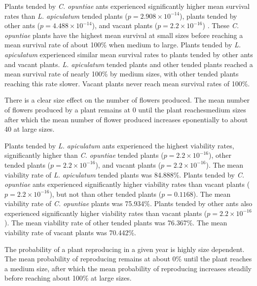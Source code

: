 \documentclass[11pt]{article}
\begin{document}
Plants tended by \textit{C. opuntiae} ants experienced significantly higher mean survival rates than \textit{L. apiculatum} tended plants ($p = 2.908 \times 10^{-14}$), plants tended by other ants ($p = 4.488 \times 10^{-14}$), and vacant plants ($p = 2.2 \times 10^{-16}$) \cite{fig:surv}. 
These \textit{C. opuntiae} plants have the highest mean survival at small sizes before reaching a mean survival rate of about 100\% when medium to large.
Plants tended by \textit{L. apiculatum} experienced similar mean survival rates to plants tended by other ants and vacant plants.
\textit{L. apiculatum} tended plants and other tended plants reached a mean survival rate of nearly 100\% by medium sizes, with other tended plants reaching this rate slower. 
Vacant plants never reach mean survival rates of 100\%. 

There is a clear size effect on the number of flowers produced. 
The mean number of flowers produced by a plant remains at 0 until the plant reachesmedium sizes after which the mean number of flower produced increases eponentially to about 40 at large sizes.


Plants tended by \textit{L. apiculatum} ants experienced the highest viability rates, significantly higher than \textit{C. opuntiae} tended plants ($p = 2.2 \times 10^{-16}$), other tended plants ($p = 2.2 \times 10^{-16}$), and vacant plants ($p = 2.2 \times 10^{-16}$).
The mean viability rate of \textit{L. apiculatum} tended plants was 84.888\%.
Plants tended by \textit{C. opuntiae} ants experienced significantly higher viability rates than vacant plants ($p = 2.2 \times 10^{-16}$), but not than other tended plants ($p = 0.1168$).
The mean viability rate of \textit{C. opuntiae} plants was 75.934\%.
Plants tended by other ants also experienced significantly higher viability rates than vacant plants ($p = 2.2 \times 10^{-16}$).
The mean viability rate of other tended plants was 76.367\%.
The mean viability rate of vacant plants was 70.442\%.

The probability of a plant reproducing in a given year is highly size dependent. 
The mean probability of reproducing remains at about 0\% until the plant reaches a medium size, after which the mean probability of reproducing increases steadily before reaching about 100\% at large sizes. 
\end{document}
